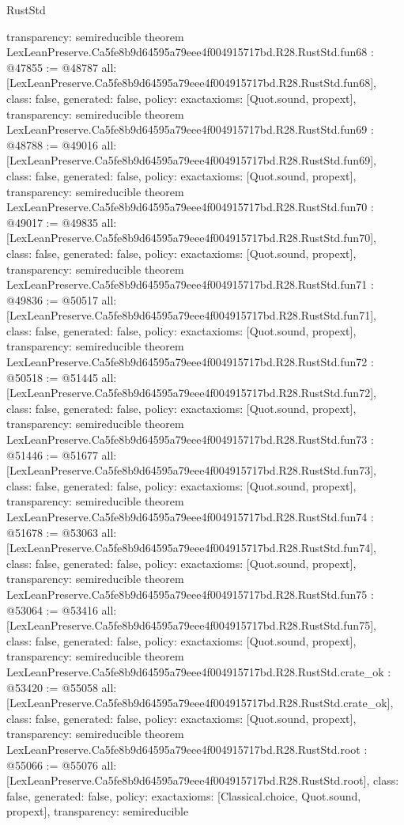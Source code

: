 \begin{lexlean}{RustStd}
\begin{coremodule}
{  transparency: semireducible
}
theorem LexLeanPreserve.Ca5fe8b9d64595a79eee4f004915717bd.R28.RustStd.fun68 : @47855 := @48787 {
  all: [LexLeanPreserve.Ca5fe8b9d64595a79eee4f004915717bd.R28.RustStd.fun68],
  class: false,
  generated: false,
  policy: exact{axioms: [Quot.sound, propext]},
  transparency: semireducible
}
theorem LexLeanPreserve.Ca5fe8b9d64595a79eee4f004915717bd.R28.RustStd.fun69 : @48788 := @49016 {
  all: [LexLeanPreserve.Ca5fe8b9d64595a79eee4f004915717bd.R28.RustStd.fun69],
  class: false,
  generated: false,
  policy: exact{axioms: [Quot.sound, propext]},
  transparency: semireducible
}
theorem LexLeanPreserve.Ca5fe8b9d64595a79eee4f004915717bd.R28.RustStd.fun70 : @49017 := @49835 {
  all: [LexLeanPreserve.Ca5fe8b9d64595a79eee4f004915717bd.R28.RustStd.fun70],
  class: false,
  generated: false,
  policy: exact{axioms: [Quot.sound, propext]},
  transparency: semireducible
}
theorem LexLeanPreserve.Ca5fe8b9d64595a79eee4f004915717bd.R28.RustStd.fun71 : @49836 := @50517 {
  all: [LexLeanPreserve.Ca5fe8b9d64595a79eee4f004915717bd.R28.RustStd.fun71],
  class: false,
  generated: false,
  policy: exact{axioms: [Quot.sound, propext]},
  transparency: semireducible
}
theorem LexLeanPreserve.Ca5fe8b9d64595a79eee4f004915717bd.R28.RustStd.fun72 : @50518 := @51445 {
  all: [LexLeanPreserve.Ca5fe8b9d64595a79eee4f004915717bd.R28.RustStd.fun72],
  class: false,
  generated: false,
  policy: exact{axioms: [Quot.sound, propext]},
  transparency: semireducible
}
theorem LexLeanPreserve.Ca5fe8b9d64595a79eee4f004915717bd.R28.RustStd.fun73 : @51446 := @51677 {
  all: [LexLeanPreserve.Ca5fe8b9d64595a79eee4f004915717bd.R28.RustStd.fun73],
  class: false,
  generated: false,
  policy: exact{axioms: [Quot.sound, propext]},
  transparency: semireducible
}
theorem LexLeanPreserve.Ca5fe8b9d64595a79eee4f004915717bd.R28.RustStd.fun74 : @51678 := @53063 {
  all: [LexLeanPreserve.Ca5fe8b9d64595a79eee4f004915717bd.R28.RustStd.fun74],
  class: false,
  generated: false,
  policy: exact{axioms: [Quot.sound, propext]},
  transparency: semireducible
}
theorem LexLeanPreserve.Ca5fe8b9d64595a79eee4f004915717bd.R28.RustStd.fun75 : @53064 := @53416 {
  all: [LexLeanPreserve.Ca5fe8b9d64595a79eee4f004915717bd.R28.RustStd.fun75],
  class: false,
  generated: false,
  policy: exact{axioms: [Quot.sound, propext]},
  transparency: semireducible
}
theorem LexLeanPreserve.Ca5fe8b9d64595a79eee4f004915717bd.R28.RustStd.crate_ok : @53420 := @55058 {
  all: [LexLeanPreserve.Ca5fe8b9d64595a79eee4f004915717bd.R28.RustStd.crate_ok],
  class: false,
  generated: false,
  policy: exact{axioms: [Quot.sound, propext]},
  transparency: semireducible
}
theorem LexLeanPreserve.Ca5fe8b9d64595a79eee4f004915717bd.R28.RustStd.root : @55066 := @55076 {
  all: [LexLeanPreserve.Ca5fe8b9d64595a79eee4f004915717bd.R28.RustStd.root],
  class: false,
  generated: false,
  policy: exact{axioms: [Classical.choice, Quot.sound, propext]},
  transparency: semireducible
}


\end{coremodule}
\end{lexlean}
